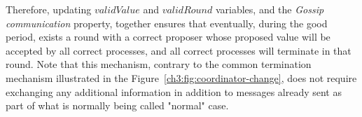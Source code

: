 Therefore, updating $validValue$ and $validRound$ variables, and the \emph{Gossip communication} property, together ensures that eventually, during the good period, exists a round with a correct proposer whose proposed value will be accepted by all correct processes, and all correct processes will terminate in that round. Note that this mechanism, contrary to the common termination mechanism illustrated in the Figure~\ref{ch3:fig:coordinator-change}, does not require exchanging any additional information in addition to messages already sent as part of what is normally being called "normal" case.     
